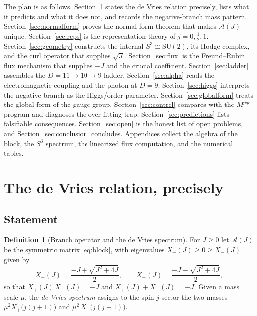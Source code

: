 \documentclass[11pt]{article}
\theoremstyle{plain}
\theoremstyle{definition}
\newtheorem{definition}[theorem]{Definition}
\newcommand{\cA}{\mathcal{A}}
\newcommand{\Xp}{X_{+}}
\newcommand{\Xm}{X_{-}}
\newcommand{\half}{\tfrac12}
\newcommand{\SU}{\mathrm{SU}}
\begin{document}
The plan is as follows. Section~\ref{sec:relation} states the de Vries
relation precisely, lists what it predicts and what it does not, and
records the negative-branch mass pattern. Section~\ref{sec:normalform}
proves the normal-form theorem that makes $\cA(J)$ unique.
Section~\ref{sec:reps} is the representation theory of $j=0,\half,1$.
Section~\ref{sec:geometry} constructs the internal $S^3\cong\SU(2)$, its
Hodge complex, and the curl operator that supplies $\sqrt J$.
Section~\ref{sec:flux} is the Freund--Rubin flux mechanism that supplies
$-J$ and the crucial coefficient. Section~\ref{sec:ladder} assembles the
$D=11\to10\to9$ ladder. Section~\ref{sec:alpha} reads the electromagnetic
coupling and the photon at $D=9$. Section~\ref{sec:higgs} interprets the
negative branch as the Higgs/order parameter. Section~\ref{sec:globalform}
treats the global form of the gauge group. Section~\ref{sec:control}
compares with the $M^{pqr}$ program and diagnoses the over-fitting trap.
Section~\ref{sec:predictions} lists falsifiable consequences.
Section~\ref{sec:open} is the honest list of open problems, and
Section~\ref{sec:conclusion} concludes. Appendices collect the algebra of
the block, the $S^3$ spectrum, the linearized flux computation, and the
numerical tables.

\section{The de Vries relation, precisely}
\label{sec:relation}

\subsection{Statement}

\begin{definition}[Branch operator and the de Vries spectrum]
For $J\ge0$ let $\cA(J)$ be the symmetric matrix \eqref{eq:block}, with
eigenvalues $\Xp(J)\ge0\ge\Xm(J)$ given by
\begin{equation}
\Xp(J)=\frac{-J+\sqrt{J^2+4J}}{2},
\qquad
\Xm(J)=\frac{-J-\sqrt{J^2+4J}}{2},
\end{equation}
so that $\Xp(J)\,\Xm(J)=-J$ and $\Xp(J)+\Xm(J)=-J$. Given a mass scale
$\mu$, the \emph{de Vries spectrum} assigns to the spin-$j$ sector the
two masses $\mu^2\Xp\!\bigl(j(j+1)\bigr)$ and $\mu^2\,\Xm\!\bigl(j(j+1)\bigr)$.
\end{definition}
\end{document}
